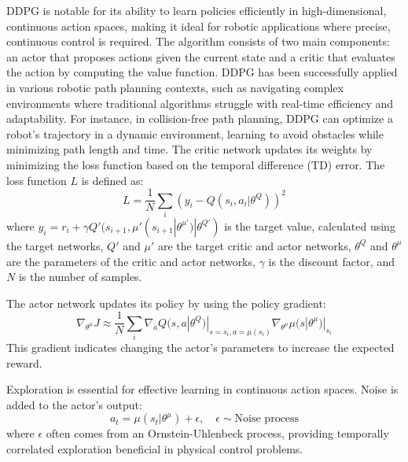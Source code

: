 \documentclass{ieeeaccess}
\begin{document}
DDPG is notable for its ability to learn policies efficiently in high-dimensional, continuous action spaces, making it ideal for robotic applications where precise, continuous control is required. The algorithm consists of two main components: an actor that proposes actions given the current state and a critic that evaluates the action by computing the value function.
DDPG has been successfully applied in various robotic path planning contexts, such as navigating complex environments where traditional algorithms struggle with real-time efficiency and adaptability. For instance, in collision-free path planning, DDPG can optimize a robot's trajectory in a dynamic environment, learning to avoid obstacles while minimizing path length and time.
The critic network updates its weights by minimizing the loss function based on the temporal difference (TD) error. The loss function \( L \) is defined as:
\begin{equation}
L = \frac{1}{N} \sum_i \left(y_i - Q(s_i, a_i | \theta^Q)\right)^2
\end{equation}
where \( y_i = r_i + \gamma Q'(s_{i+1}, \mu'(s_{i+1} | \theta^{\mu'}) | \theta^{Q'}) \) is the target value, calculated using the target networks, \( Q' \) and \( \mu' \) are the target critic and actor networks, \( \theta^Q \) and \( \theta^{\mu} \) are the parameters of the critic and actor networks, \( \gamma \) is the discount factor, and \( N \) is the number of samples.

The actor network updates its policy by using the policy gradient:
\begin{equation}
\nabla_{\theta^\mu} J \approx \frac{1}{N} \sum_i \nabla_a Q(s, a | \theta^Q)|_{s=s_i, a=\mu(s_i)} \nabla_{\theta^\mu} \mu(s | \theta^\mu)|_{s_i}
\end{equation}
This gradient indicates changing the actor's parameters to increase the expected reward.

Exploration is essential for effective learning in continuous action spaces. Noise is added to the actor's output:
\begin{equation}
a_t = \mu(s_t|\theta^\mu) + \epsilon, \quad \epsilon \sim \text{Noise process}
\end{equation}
where \( \epsilon \) often comes from an Ornstein-Uhlenbeck process, providing temporally correlated exploration beneficial in physical control problems.
\end{document}
